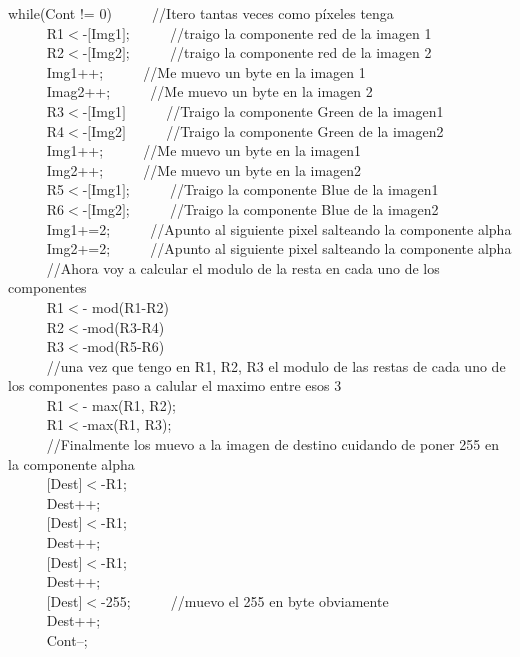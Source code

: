 while(Cont != 0){  	$~~~~~~~~~~$	//Itero tantas veces como píxeles tenga\\
$~~~~~~~~~~~$	R1$<$-$[$Img1$]$;  	$~~~~~~~~~~$	//traigo la componente red de la imagen 1\\
$~~~~~~~~~~~$	R2$<$-$[$Img2$]$; 	 $~~~~~~~~~~$	//traigo la componente red de la imagen 2\\
$~~~~~~~~~~~$	Img1++; 	 $~~~~~~~~~~$	//Me muevo un byte en la imagen 1\\
$~~~~~~~~~~~$	Imag2++; 	$~~~~~~~~~~$	//Me muevo un byte en la imagen 2\\
$~~~~~~~~~~~$	R3$<$-$[$Img1$]$ 	$~~~~~~~~~~$	//Traigo la componente Green de la imagen1\\
$~~~~~~~~~~~$	R4$<$-$[$Img2$]$ 	$~~~~~~~~~~$	//Traigo la componente Green de la imagen2\\
$~~~~~~~~~~~$	Img1++; 	$~~~~~~~~~~$	//Me muevo un byte en la imagen1\\
$~~~~~~~~~~~$	Img2++;        	$~~~~~~~~~~$	//Me muevo un byte en la imagen2\\
$~~~~~~~~~~~$	R5$<$-$[$Img1$]$; 		$~~~~~~~~~~$ //Traigo la componente Blue de la imagen1\\
$~~~~~~~~~~~$	R6$<$-$[$Img2$]$; 	$~~~~~~~~~~$	//Traigo la componente Blue de la imagen2\\
$~~~~~~~~~~~$	Img1+=2;	$~~~~~~~~~~$	//Apunto al siguiente pixel salteando la componente alpha\\
$~~~~~~~~~~~$	Img2+=2; 	$~~~~~~~~~~$	//Apunto al siguiente pixel salteando la componente alpha\\
$~~~~~~~~~~~$	//Ahora voy a calcular el modulo de la resta en cada uno de los componentes\\
$~~~~~~~~~~~$	R1$<$- mod(R1-R2)\\
$~~~~~~~~~~~$	R2$<$-mod(R3-R4)\\
$~~~~~~~~~~~$	R3$<$-mod(R5-R6)\\
$~~~~~~~~~~~$	//una vez que tengo  en R1, R2, R3 el modulo de las restas de cada uno de los componentes paso a calular el maximo entre esos 3\\
$~~~~~~~~~~~$	R1$<$- max(R1, R2); \\
$~~~~~~~~~~~$	R1$<$-max(R1, R3);\\
$~~~~~~~~~~~$	//Finalmente los muevo a la imagen de destino cuidando de poner 255 en la componente alpha\\
$~~~~~~~~~~~$	$[$Dest$]$$<$-R1;\\
$~~~~~~~~~~~$	Dest++;\\
$~~~~~~~~~~~$	$[$Dest$]$$<$-R1;\\
$~~~~~~~~~~~$	Dest++;\\
$~~~~~~~~~~~$	$[$Dest$]$$<$-R1;\\
$~~~~~~~~~~~$	Dest++;\\
$~~~~~~~~~~~$	$[$Dest$]$$<$-255; 	$~~~~~~~~~~$	//muevo el 255 en byte obviamente\\
$~~~~~~~~~~~$	Dest++;\\
$~~~~~~~~~~~$	Cont--;\\

}

